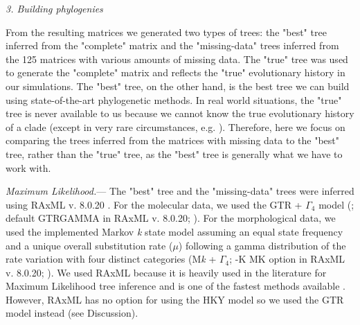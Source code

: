\documentclass[12pt,letterpaper]{article}
\renewcommand{\subsection}[1]{%
\bigskip
\begin{center}
\begin{large}
\normalfont\itshape #1
\end{large}
\end{center}}
\renewcommand{\subsubsection}[1]{%
\vspace{2ex}
\noindent
\textit{#1.}---}
\begin{document}

\subsection{3. Building phylogenies}
From the resulting matrices we generated two types of trees: the "best" tree inferred from the "complete" matrix and the "missing-data" trees inferred from the 125 matrices with various amounts of missing data. The "true" tree was used to generate the "complete" matrix and reflects the "true" evolutionary history in our simulations. The "best" tree, on the other hand, is the best tree we can build using state-of-the-art phylogenetic methods. In real world situations, the "true" tree is never available to us because we cannot know the true evolutionary history of a clade (except in very rare circumstances, e.g. \citealt{rozen2005}). Therefore, here we focus on comparing the trees inferred from the matrices with missing data to the "best" tree, rather than the "true" tree, as the "best" tree is generally what we have to work with.

\subsubsection{Maximum Likelihood}
The "best" tree and the "missing-data" trees were inferred using RAxML v. 8.0.20 \citep{Stamatakis21012014}. For the molecular data, we used the GTR + $\Gamma_4$ model (\citealt{tavare1986}; default GTRGAMMA in RAxML v. 8.0.20; \citealt{Stamatakis21012014}). For the morphological data, we used the implemented Markov \textit{k} state model \citep{lewisa2001} assuming an equal state frequency and a unique overall substitution rate ($\mu$) following a gamma distribution of the rate variation with four distinct categories (M\textit{k} + $\Gamma_4$; -K MK option in RAxML v. 8.0.20; \citealt{Stamatakis21012014}).
We used RAxML because it is heavily used in the literature for Maximum Likelihood tree inference \citep[][e.g.]{rouresite-specific2011,Bogdanowicz2012,springermacroevolutionary2012,O'Leary08022013,kellymolecular2014} and is one of the fastest methods available \citep{Stamatakis01102008}. However, RAxML has no option for using the HKY model so we used the GTR model instead (see Discussion).
\end{document}
